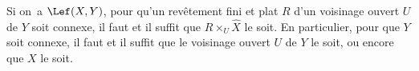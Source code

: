 \begin{corollaire} \label{X.2.4}
Si on~a $\Lef (X, Y)$, pour qu'un rev\^etement fini et plat $R$ d'un voisinage ouvert $U$ de $Y$ soit connexe, il faut et il suffit que $R \times_U \hat{X}$ le soit. En particulier, pour que $Y$ soit connexe, il faut et il suffit que le voisinage ouvert $U$ de $Y$ le soit, ou encore que $X$ le soit.
\end{corollaire}

